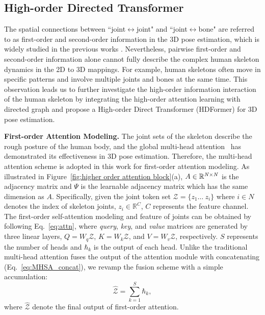 \documentclass{article}
\begin{document}
\subsection{High-order Directed Transformer}
\label{sec:High-order Directed Transformer}
The spatial connections between ``joint$\leftrightarrow$joint" and ``joint$\leftrightarrow$bone" are referred to as first-order and second-order information in the 3D pose estimation, which is widely studied in the previous works \cite{ZhangCVPR22MixSTE}. Nevertheless, pairwise first-order and second-order information alone cannot fully describe the complex human skeleton dynamics in the 2D to 3D mappings. For example, human skeletons often move in specific patterns and involve multiple joints and bones at the same time. This observation leads us to further investigate the high-order information interaction of the human skeleton by integrating the high-order attention learning with directed graph and propose a High-order Direct Transformer (HDFormer) for 3D pose estimation.

\noindent \textbf{First-order Attention Modeling.} 
The joint sets of the skeleton describe the rough posture of the human body, and the global multi-head attention~\cite{ZhangCVPR22MixSTE} has demonstrated its effectiveness in 3D pose estimation. Therefore, the multi-head attention scheme is adopted in this work for first-order attention modeling. As illustrated in Figure~\ref{fig:higher order attention block}(a), $ A \in \mathbb{R}^{\it{N \times N}}$ is the adjacency matrix and  $\Psi$ is the learnable adjacency matrix which has the same dimension as $A$. Specifically, given the joint token set $\mathcal{Z} = \{z_{1}\dots\ z_{i}\}$ where $i \in N$ denotes the index of skeleton joints, $z_{i} \in \mathbb{R}^{C}$, $C$ represents the feature channel. The first-order self-attention modeling and feature of joints can be obtained by following Eq.~\ref{eq:attn}, where \textit{query}, \textit{key}, and \textit{value} matrices are generated by three linear layers, $Q=W_{q}\mathcal{Z}$, $K=W_{k}\mathcal{Z}$, and $V=W_{v}\mathcal{Z}$, respectively. $S$ represents the number of heads and $\hbar_{k}$ is the output of each head. Unlike the traditional multi-head attention fuses the output of the attention module with concatenating (Eq.~\ref{eq:MHSA_concat}), we revamp the fusion scheme with a simple accumulation:
\begin{equation}
    \hat{\mathcal{Z}} = \sum_{k=1}^{S} \hbar_{k},
\end{equation}
where $\hat{\mathcal{Z}}$ denote the final output of first-order attention.
\end{document}
